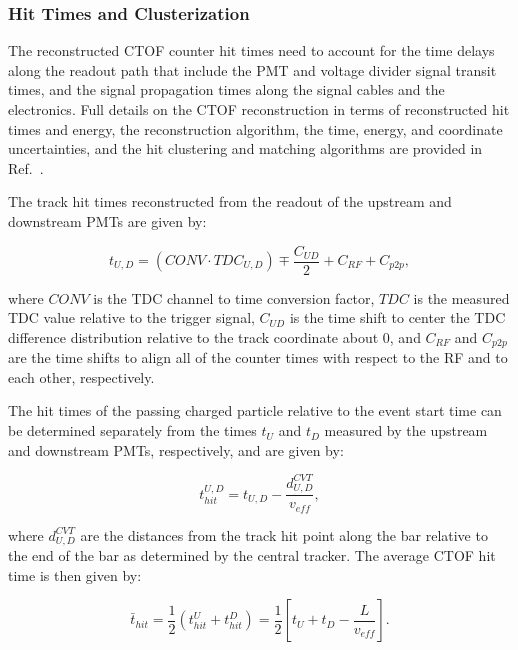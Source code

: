 \documentclass{elsart}
\begin{document}
\subsubsection{Hit Times and Clusterization}
\label{cluster}

The reconstructed CTOF counter hit times need to account for the time delays along the readout
path that include the PMT and voltage divider signal transit times, and the signal propagation times along
the signal cables and the electronics. Full details on the CTOF reconstruction in terms of reconstructed hit
times and energy, the reconstruction algorithm, the time, energy, and coordinate uncertainties, and
the hit clustering and matching algorithms are provided in Ref.~\cite{ctof-recon}.

The track hit times reconstructed from the readout of the upstream and downstream PMTs are given by:

\begin{equation}
t_{U,D} = (CONV \cdot TDC_{U,D}) \mp \frac{C_{UD}}{2} + C_{RF} + C_{p2p},
\end{equation}

\noindent
where $CONV$ is the TDC channel to time conversion factor, $TDC$ is the measured TDC value relative
to the trigger signal, $C_{UD}$ is the time shift to center the TDC difference distribution relative to the
track coordinate about 0, and $C_{RF}$ and $C_{p2p}$ are the time shifts to align all of the counter times
with respect to the RF and to each other, respectively.

The hit times of the passing charged particle relative to the event start time can be determined separately 
from the times $t_U$ and $t_D$ measured by the upstream and downstream PMTs, respectively, and are
given by:

\begin{equation}
t_{hit}^{U,D} = t_{U,D} - \frac{d^{CVT}_{U,D}}{v_{eff}},
\end{equation}

\noindent
where $d^{CVT}_{U,D}$ are the distances from the track hit point along the bar relative to the end of the
bar as determined by the central tracker. The average CTOF hit time is then given by:

\begin{equation}
\bar{t}_{hit} = \frac{1}{2} ( t_{hit}^U + t_{hit}^D ) = \frac{1}{2} \left[ t_U + t_D - \frac{L}{v_{eff}} \right].
\end{equation}
\end{document}
